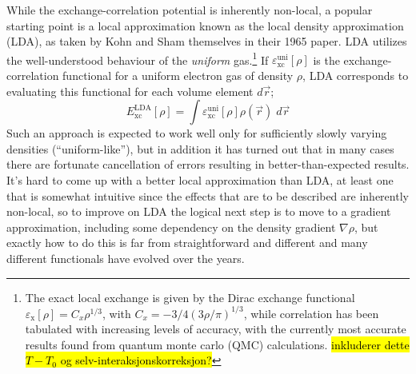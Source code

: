 \documentclass[11pt,bibliography=totoc,index=totoc]{scrbook}   %
\newcommand{\comment}[1]{\hl{#1}}
\begin{document}
While the exchange-correlation potential is inherently non-local, a popular starting point is a local approximation known as the local density approximation (LDA),
as taken by Kohn and Sham themselves in their 1965 paper.\cite{KohnSham:1965}
LDA utilizes the well-understood behaviour of the \emph{uniform} gas.\footnote{
    The exact local exchange is given by the Dirac exchange functional $\varepsilon_{\text{x}}[\rho]=C_x \rho^{1/3}$, with $C_x=-3/4(3\rho/\pi)^{1/3}$,\cite{Dirac:1930}\cite[108]{Parr:1994} 
while correlation has been tabulated with increasing levels of accuracy, with the currently most accurate results found from quantum monte carlo (QMC) calculations.\cite[p. 109 and references 297-299 within]{Martin:2004} \comment{inkluderer dette $T-T_0$ og selv-interaksjonskorreksjon?}}
If $\varepsilon_{\text{xc}}^{\text{uni}}[\rho]$ is the exchange-correlation functional for a uniform electron gas of density $\rho$,
LDA corresponds to evaluating this functional for each volume element $d\vec{r}$;
\begin{equation}
    E_{\text{xc}}^{\text{LDA}}[\rho] = \int \varepsilon_{\text{xc}}^{\text{uni}}[\rho] \rho(\vec{r}) \;d\vec{r}
  \label{eq:lda}
\end{equation}
Such an approach is expected to work well only for sufficiently slowly varying densities (``uniform-like''), 
but in addition it has turned out that in many cases there are fortunate cancellation of errors resulting in better-than-expected results.\cite{Gunnarson:1976}\cite[529]{Kantorovich:2004}\cite[180]{Parr:1994}
It's hard to come up with a better local approximation than LDA, at least one that is somewhat intuitive 
since the effects that are to be described are inherently non-local, so 
to improve on LDA the logical next step is to move to a gradient approximation, including some dependency on the density gradient $\nabla\rho$, but exactly how to do this is far from straightforward and different and many different functionals have evolved over the years. 
\end{document}
